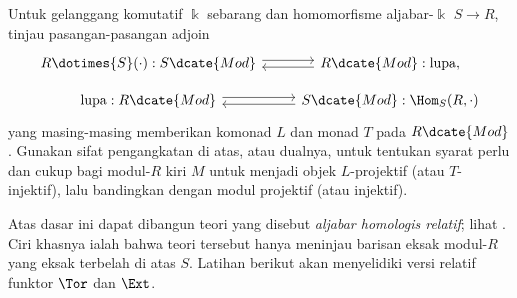 	\item Untuk gelanggang komutatif $\Bbbk$ sebarang dan homomorfisme
	aljabar-$\Bbbk$ $S\to R$, tinjau pasangan-pasangan adjoin
	\begin{equation*}\begin{tikzcd}[row sep=small]
		R \dotimes{S} (\cdot): S\dcate{Mod} \arrow[shift left, r] & R\dcate{Mod}: \text{lupa}, \arrow[shift left, l] \\
		\text{lupa}: R\dcate{Mod} \arrow[shift left, r] & S\dcate{Mod}: \Hom_S(R, \cdot) \arrow[shift left, l]
	\end{tikzcd}\end{equation*}
	yang masing-masing memberikan komonad $L$ dan monad $T$ pada
	$R\dcate{Mod}$. Gunakan sifat pengangkatan di atas, atau dualnya, untuk
	tentukan syarat perlu dan cukup bagi modul-$R$ kiri $M$ untuk menjadi
	objek $L$-projektif (atau $T$-injektif), lalu bandingkan dengan modul
	projektif (atau injektif).

	Atas dasar ini dapat dibangun teori yang disebut \emph{aljabar homologis
	relatif}; lihat \cite{Ho56}. Ciri khasnya ialah bahwa teori tersebut
	hanya meninjau barisan eksak modul-$R$ yang eksak terbelah di atas $S$.
	Latihan berikut akan menyelidiki versi relatif funktor $\Tor$ dan $\Ext$.

